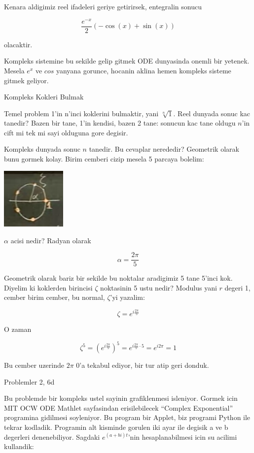 \documentclass[12pt,fleqn]{article}\usepackage{../common}
\begin{document}
Kenara aldigimiz reel ifadeleri geriye getirirsek, entegralin sonucu

\[ \frac{e^{-x}}{2}(-\cos(x) + \sin(x)) \]

olacaktir. 

Kompleks sistemine bu sekilde gelip gitmek ODE dunyasinda onemli bir
yetenek. Mesela $e^{x}$ ve $cos$ yanyana gorunce, hocanin aklina hemen
kompleks sisteme gitmek geliyor. 

Kompleks Kokleri Bulmak

Temel problem 1'in n'inci koklerini bulmaktir, yani $\sqrt[n]{1}$. Reel
dunyada sonuc kac tanedir? Bazen bir tane, 1'in kendisi, bazen 2 tane:
sonucun kac tane oldugu $n$'in cift mi tek mi sayi olduguna gore degisir.

Kompleks dunyada sonuc $n$ tanedir. Bu cevaplar nerededir? Geometrik olarak
bunu gormek kolay. Birim cemberi cizip mesela 5 parcaya bolelim:

\includegraphics[height=3cm]{6_5.png}

$\alpha$ acisi nedir? Radyan olarak 

\[ \alpha = \frac{2\pi}{5} \]

Geometrik olarak bariz bir sekilde bu noktalar aradigimiz 5 tane 5'inci
kok. Diyelim ki koklerden birincisi $\zeta$ noktasinin 5 ustu nedir?
Modulus yani $r$ degeri 1, cember birim cember, bu normal, $\zeta$'yi yazalim:

\[ \zeta = e^{i\frac{2\pi}{5}} \]

O zaman

\[ 
\zeta^5 = (e^{i\frac{2\pi}{5}})^5 = e^{i\frac{2\pi}{5} \cdot 5} = e^{i2\pi} =
1 
\]

Bu cember uzerinde $2\pi$ 0'a tekabul ediyor, bir tur atip geri donduk. 

Problemler 2, 6d

Bu problemde bir kompleks ustel sayinin grafiklenmesi isleniyor. Gormek
icin MIT OCW ODE Mathlet sayfasindan erisilebilecek ``Complex Exponential''
programina gidilmesi soyleniyor. Bu program bir Applet, biz programi Python
ile tekrar kodladik. Programin alt kisminde gorulen iki ayar ile degisik a
ve b degerleri denenebiliyor. Sagdaki $e^{(a+bi)t}$'nin hesaplanabilmesi
icin su acilimi kullandik:
\end{document}
